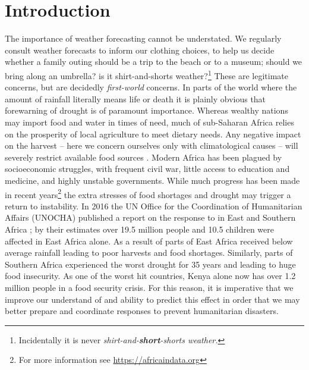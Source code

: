 \section{Introduction}

The importance of weather forecasting cannot be understated. We
regularly consult weather forecasts to inform our clothing choices, to
help us decide whether a family outing should be a trip to the beach
or to a museum; should we bring along an umbrella? is it
shirt-and-shorts weather?\footnote{Incidentally it is never
  \emph{shirt-and-\textbf{short}-shorts weather.}} These are
legitimate concerns, but are decidedly \emph{first-world} concerns. In
parts of the world where the amount of rainfall literally means life
or death it is plainly obvious that forewarning of drought is of
paramount importance. Whereas wealthy nations may import food and
water in times of need, much of sub-Saharan Africa relies on the
prosperity of local agriculture to meet dietary needs. Any negative
impact on the harvest -- here we concern ourselves only with
climatological causes -- will severely restrict available food sources
\citep{development2006mapping}. Modern Africa has been plagued by
socioeconomic struggles, with frequent civil war, little access to
education and medicine, and highly unstable governments. While much
progress has been made in recent years\footnote{For more information
  see \url{https://africaindata.org}} the extra stresses of food
shortages and drought may trigger a return to instability.
In 2016 the UN Office for the Coordination of Humanitarian Affairs
(UNOCHA) published a report on the response to \elnino{} in East and
Southern Africa \citep{unocha2016}; by their estimates over 19.5
million people and 10.5 children were affected in East Africa
alone. As a result of \elnino{} parts of East Africa received below
average rainfall leading to poor harvests and food
shortages. Similarly, parts of Southern Africa experienced the worst
drought for 35 years and leading to huge food insecurity. As one of the
worst hit countries, Kenya alone now has over 1.2 million people in a
food security crisis. For this reason, it is imperative that we
improve our understand of and ability to predict this effect in order
that we may better prepare and coordinate responses to prevent
humanitarian disasters.



